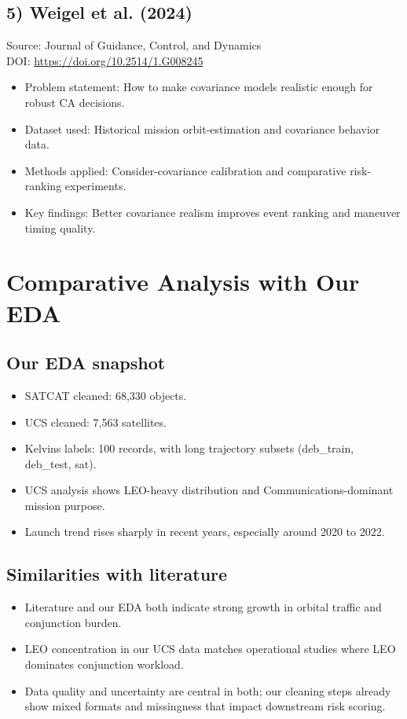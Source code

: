 \documentclass[11pt]{article}
\begin{document}
\subsection*{5) Weigel et al. (2024)}
Source: Journal of Guidance, Control, and Dynamics\\
DOI: \url{https://doi.org/10.2514/1.G008245}
\begin{itemize}
\item Problem statement: How to make covariance models realistic enough for robust CA decisions.
\item Dataset used: Historical mission orbit-estimation and covariance behavior data.
\item Methods applied: Consider-covariance calibration and comparative risk-ranking experiments.
\item Key findings: Better covariance realism improves event ranking and maneuver timing quality.
\end{itemize}

\section*{Comparative Analysis with Our EDA}

\subsection*{Our EDA snapshot}
\begin{itemize}
\item SATCAT cleaned: 68,330 objects.
\item UCS cleaned: 7,563 satellites.
\item Kelvins labels: 100 records, with long trajectory subsets (deb\_train, deb\_test, sat).
\item UCS analysis shows LEO-heavy distribution and Communications-dominant mission purpose.
\item Launch trend rises sharply in recent years, especially around 2020 to 2022.
\end{itemize}

\subsection*{Similarities with literature}
\begin{itemize}
\item Literature and our EDA both indicate strong growth in orbital traffic and conjunction burden.
\item LEO concentration in our UCS data matches operational studies where LEO dominates conjunction workload.
\item Data quality and uncertainty are central in both; our cleaning steps already show mixed formats and missingness that impact downstream risk scoring.
\end{itemize}
\end{document}
